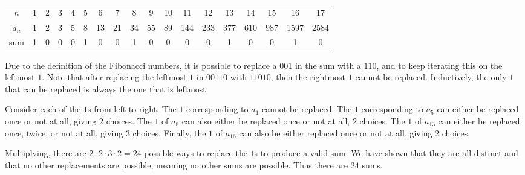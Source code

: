\documentclass[11pt,paper=letter]{scrartcl}
\begin{document}
\begin{enumerate}[left=0pt]
\begin{center}
  \begin{tabular}{c c c c c c c c c c c c c c c c c c}
    $n$ & 1 & 2 & 3 & 4 & 5 & 6 & 7 & 8 & 9 & 10 & 11 & 12 & 13 & 14 & 15 & 16 & 17 \\
    $a_n$ & 1 & 2 & 3 & 5 & 8 & 13 & 21 & 34 & 55 & 89 & 144 & 233 & 377 & 610 & 987 & 1597 & 2584 \\
    sum & 1 & 0 & 0 & 0 & 1 & 0 & 0 & 1 & 0 & 0 & 0 & 0 & 1 & 0 & 0 & 1 & 0
  \end{tabular}
\end{center}

Due to the definition of the Fibonacci numbers, it is possible to replace a $001$ in the sum with a $110$, and to keep iterating this on the leftmost $1$. Note that after replacing the leftmost $1$ in $00110$ with $11010$, then the rightmost $1$ cannot be replaced. Inductively, the only $1$ that can be replaced is always the one that is leftmost.

Consider each of the $1$s from left to right. The $1$ corresponding to $a_1$ cannot be replaced. The $1$ corresponding to $a_5$ can either be replaced once or not at all, giving $2$ choices. The $1$ of $a_{8}$ can also either be replaced once or not at all, $2$ choices. The $1$ of $a_{13}$ can either be replaced once, twice, or not at all, giving $3$ choices. Finally, the $1$ of $a_{16}$ can also be either replaced once or not at all, giving $2$ choices.

Multiplying, there are $2 \cdot 2 \cdot 3 \cdot 2 = 24$ possible ways to replace the $1$s to produce a valid sum. We have shown that they are all distinct and that no other replacements are possible, meaning no other sums are possible. Thus there are $24$ sums.

\end{enumerate}
\end{document}
